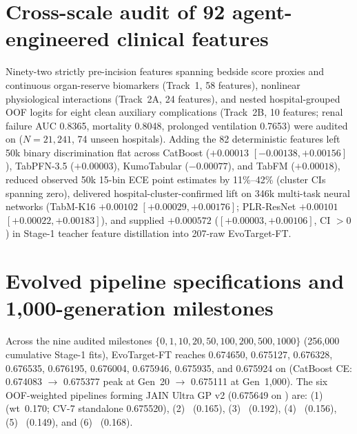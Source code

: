 \section{Cross-scale audit of 92 agent-engineered clinical features}
\label{supp:agentic_fe}
Ninety-two strictly pre-incision features spanning bedside score proxies and continuous organ-reserve biomarkers (Track~1, 58 features), nonlinear physiological interactions (Track~2A, 24 features), and nested hospital-grouped OOF logits for eight clean auxiliary complications (Track~2B, 10 features; renal failure AUC 0.8365, mortality 0.8048, prolonged ventilation 0.7653) were audited on  ($N=21{,}241$, 74 unseen hospitals). Adding the 82 deterministic features left 50k binary discrimination flat across CatBoost ($+0.00013$ $[-0.00138, +0.00156]$), TabPFN-3.5 ($+0.00003$), KumoTabular ($-0.00077$), and TabFM ($+0.00018$), reduced observed 50k 15-bin ECE point estimates by 11\%--42\% (cluster CIs spanning zero), delivered hospital-cluster-confirmed lift on 346k multi-task neural networks (TabM-K16\cite{gorishniy2025tabm} $+0.00102$ $[+0.00029, +0.00176]$; PLR-ResNet $+0.00101$ $[+0.00022, +0.00183]$), and supplied $+0.000572$ ($[+0.00003, +0.00106]$, CI $>0$) in Stage-1 teacher feature distillation into 207-raw EvoTarget-FT.

\section{Evolved pipeline specifications and 1,000-generation milestones}
\label{supp:math}
Across the nine audited milestones $\{0,1,10,20,50,100,200,500,1000\}$ (256,000 cumulative Stage-1 fits), EvoTarget-FT reaches 0.674650, 0.675127, 0.676328, 0.676535, 0.676195, 0.676004, 0.675946, 0.675935, and 0.675924 on  (CatBoost CE: 0.674083 $\to$ 0.675377 peak at Gen~20 $\to$ 0.675111 at Gen~1,000). The six OOF-weighted pipelines forming JAIN Ultra GP v2 (0.675649 on ) are: (1)~ (wt~0.170; CV-7 standalone 0.675520), (2)~ (0.165), (3)~ (0.192), (4)~ (0.156), (5)~ (0.149), and (6)~ (0.168).




